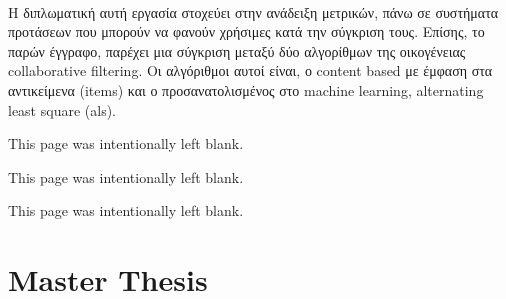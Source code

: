 \documentclass[12pt, a4paper, oneside, greek]{report}
\begin{document}
	\paragraph{} Η διπλωματική αυτή εργασία στοχεύει στην ανάδειξη μετρικών, πάνω σε συστήματα προτάσεων που μπορούν να φανούν χρήσιμες κατά την σύγκριση τους. Επίσης, το παρών έγγραφο, παρέχει μια σύγκριση μεταξύ δύο αλγορίθμων της οικογένειας collaborative filtering. Οι αλγόριθμοι αυτοί είναι, ο content based με έμφαση στα αντικείμενα (items) και ο προσανατολισμένος στο machine learning, alternating least square (als).
	\newpage
	
	\tableofcontents
	\newpage
	\begin{center}
		This page was intentionally left blank.
	\end{center}
	\newpage
	\listoftables
	\newpage
	\begin{center}
		This page was intentionally left blank.
	\end{center}
	\newpage
	\listoffigures
	\newpage
	
	\begin{center}
		This page was intentionally left blank.
	\end{center}
	\newpage
	\part{Master Thesis}
	
	
	
	
	
	\newpage
	
	
	
\end{document}
